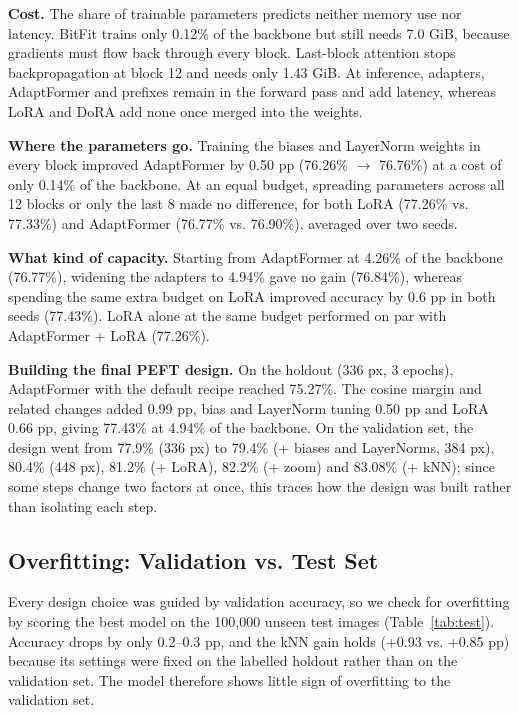 \textbf{Cost.} The share of trainable parameters predicts neither memory use nor latency. BitFit trains only 0.12\% of the backbone but still needs 7.0 GiB, because gradients must flow back through every block. Last-block attention stops backpropagation at block 12 and needs only 1.43 GiB. At inference, adapters, AdaptFormer and prefixes remain in the forward pass and add latency, whereas LoRA and DoRA add none once merged into the weights.

\textbf{Where the parameters go.} Training the biases and LayerNorm weights in every block improved AdaptFormer by 0.50 pp (76.26\% $\rightarrow$ 76.76\%) at a cost of only 0.14\% of the backbone. At an equal budget, spreading parameters across all 12 blocks or only the last 8 made no difference, for both LoRA (77.26\% vs. 77.33\%) and AdaptFormer (76.77\% vs. 76.90\%), averaged over two seeds.

\textbf{What kind of capacity.} Starting from AdaptFormer at 4.26\% of the backbone (76.77\%), widening the adapters to 4.94\% gave no gain (76.84\%), whereas spending the same extra budget on LoRA improved accuracy by 0.6 pp in both seeds (77.43\%). LoRA alone at the same budget performed on par with AdaptFormer + LoRA (77.26\%).

\textbf{Building the final PEFT design.} On the holdout (336 px, 3 epochs), AdaptFormer with the default recipe reached 75.27\%. The cosine margin and related changes added 0.99 pp, bias and LayerNorm tuning 0.50 pp and LoRA 0.66 pp, giving 77.43\% at 4.94\% of the backbone. On the validation set, the design went from 77.9\% (336 px) to 79.4\% (+ biases and LayerNorms, 384 px), 80.4\% (448 px), 81.2\% (+ LoRA), 82.2\% (+ zoom) and 83.08\% (+ kNN); since some steps change two factors at once, this traces how the design was built rather than isolating each step.

\subsection{Overfitting: Validation vs. Test Set}\label{overfitting-validation-vs.-test-set}

Every design choice was guided by validation accuracy, so we check for overfitting by scoring the best model on the 100,000 unseen test images (Table~\ref{tab:test}). Accuracy drops by only 0.2--0.3 pp, and the kNN gain holds (+0.93 vs. +0.85 pp) because its settings were fixed on the labelled holdout rather than on the validation set. The model therefore shows little sign of overfitting to the validation set.




